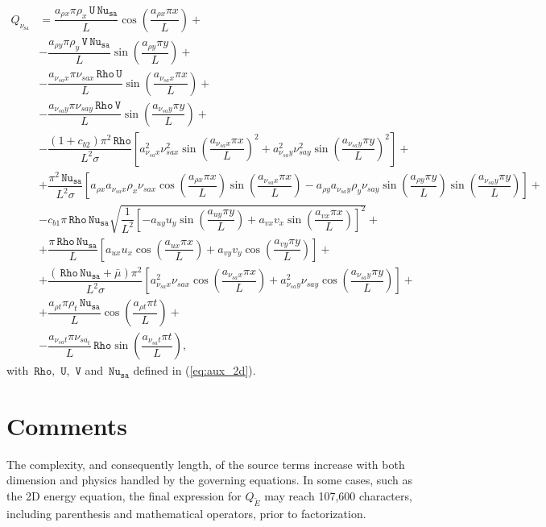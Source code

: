 \documentclass[10pt]{article}
\newcommand{\Rho}{\,\mathtt{Rho}}
\newcommand{\U}{\,\mathtt{U}}
\newcommand{\V}{\,\mathtt{V}}
\newcommand{\Nu}{\,\mathtt{Nu_{sa}}}
\newcommand{\sa}{\nu_{\mathrm{sa}}}
\newcommand{\tE}{\tilde{E}}
\newcommand{\bmu}{\bar{\mu}}
\begin{document}
\begin{equation}
 \begin{split}
  Q_{\sa} &= \dfrac{a_{\rho x} \pi \rho_x \U \Nu  }{L}\cos\left(\dfrac{a_{\rho x} \pi x}{L}\right)+ \\
&-\dfrac{a_{\rho y} \pi \rho_y \V \Nu }{L}\sin\left(\dfrac{a_{\rho y} \pi y}{L}\right)+ \\
&-\dfrac{a_{\nu_{sa} x} \pi \nu_{sa x} \Rho \U }{L}\sin\left(\dfrac{a_{\nu_{sa} x} \pi x}{L}\right)+ \\
&-\dfrac{a_{\nu_{sa} y} \pi \nu_{sa y} \Rho \V }{L}\sin\left(\dfrac{a_{\nu_{sa} y} \pi y}{L}\right)+ \\
&-\dfrac{(1+c_{b2}) \pi^2 \Rho}{L^2 \sigma}\left[a_{\nu_{sa} x}^2 \nu_{sa x}^2  \sin\left(\dfrac{a_{\nu_{sa} x} \pi x}{L}\right)^2+a_{\nu_{sa} y}^2 \nu_{sa y}^2  \sin\left(\dfrac{a_{\nu_{sa} y} \pi y}{L}\right)^2\right]+\\
&+\dfrac{\pi^2 \Nu}{ L^2\sigma}\left[a_{\rho x} a_{\nu_{sa} x} \rho_x \nu_{sa x}  \cos\left(\dfrac{a_{\rho x} \pi x}{L}\right)  \sin\left(\dfrac{a_{\nu_{sa} x} \pi x}{L}\right)-a_{\rho y} a_{\nu_{sa} y} \rho_y \nu_{sa y}  \sin\left(\dfrac{a_{\rho y} \pi y}{L}\right)  \sin\left(\dfrac{a_{\nu_{sa} y} \pi y}{L}\right)\right] +\\
 &-c_{b1}  \pi \Rho \Nu \sqrt{\dfrac{1}{L^2} \left[-a_{uy} u_y  \sin\left(\dfrac{a_{uy} \pi y}{L}\right)+a_{vx} v_x  \sin\left(\dfrac{a_{vx} \pi x}{L}\right)\right]^2}+\\
&+\dfrac{\pi \Rho \Nu}{L}\left[a_{ux} u_x  \cos\left(\dfrac{a_{ux} \pi x}{L}\right)+a_{vy} v_y  \cos\left(\dfrac{a_{vy} \pi y}{L}\right)\right] + \\
 &+\dfrac{(\Rho \Nu+\bmu) \pi^2}{L^2 \sigma}\left[a_{\nu_{sa} x}^2 \nu_{sa x}  \cos\left(\dfrac{a_{\nu_{sa} x} \pi x}{L}\right)+a_{\nu_{sa} y}^2 \nu_{sa y}  \cos\left(\dfrac{a_{\nu_{sa} y} \pi y}{L}\right)\right]+\\
&+ \dfrac{a_{\rho t} \pi \rho_t \Nu}{L} \cos\left(\dfrac{a_{\rho t} \pi t}{L}\right)+\\
&- \dfrac{a_{\nu_{sa}t} \pi \nu_{sa_t}}{L} \Rho \sin\left(\dfrac{a_{\nu_{sa} t} \pi t}{L}\right),
 \end{split}
\end{equation}
with  $\Rho,\, \U,\,\V$ and $\Nu$ defined in (\ref{eq:aux_2d}).


\section{Comments}
The complexity, and consequently length, of the source terms increase with both dimension and physics handled by the governing equations. In some cases, such as the 2D energy equation, the final expression for $Q_{\tE}$ may reach 107,600 characters, including parenthesis and mathematical operators, prior to factorization.
\end{document}
